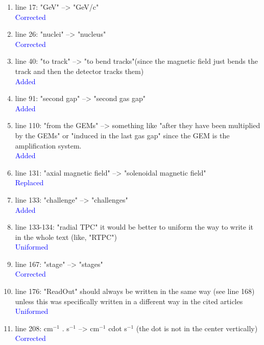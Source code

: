 \documentclass[a4paper,11pt,twoside]{article}
\begin{document}
\begin{enumerate}
\item line 17: "GeV" --> "GeV/c"\\
\textcolor{blue}{Corrected} 

\item line 26: "nuclei" --> "nucleus"\\
\textcolor{blue}{Corrected} 

\item line 40: "to track" --> "to bend tracks"(since the magnetic field just 
   bends the track and then the detector tracks them)\\
\textcolor{blue}{Added} 

\item line 91: "second gap" --> "second gas gap"\\
\textcolor{blue}{Added} 

\item line 110: "from the GEMs" -->  something like "after they have been 
   multiplied by the GEMs" or "induced in the last gas gap" since the GEM is 
   the amplification system.\\
\textcolor{blue}{Added} 

\item line 131: "axial magnetic field" --> "solenoidal magnetic field"\\
\textcolor{blue}{Replaced} 

\item line 133: "challenge" --> "challenges"\\
\textcolor{blue}{Added} 

\item line 133-134: "radial TPC" it would be better to uniform the way to write 
   it in the whole text (like, "RTPC")\\
\textcolor{blue}{Uniformed} 

\item line 167: "stage" --> "stages"\\
\textcolor{blue}{Corrected} 

\item line 176: "ReadOut" should always be written in the same way (see line 
   168) unless this was specifically written in a different way in the cited 
   articles\\
\textcolor{blue}{Uniformed} 

\item line 208: cm$^{-1}$ . s$^{-1}$ --> cm$^{-1}$ cdot s$^{-1}$ (the dot is 
   not in the center vertically)\\
\textcolor{blue}{Corrected} 


\end{enumerate}
\end{document}
